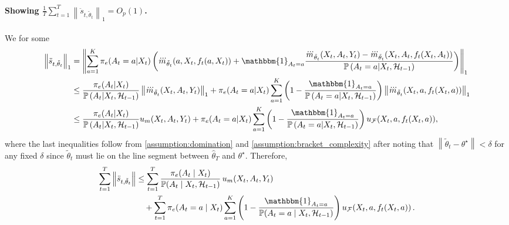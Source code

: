 \documentclass[11pt]{article}
\newcommand{\norm}[1]{\left\lVert#1\right\rVert}
\begin{document}
\begin{appendix}
\paragraph{Showing $\frac{1}{T}  \sum_{t=1}^{T} \norm{\ddot{s}_{t,\tilde{\theta}_{t}}}_{1} = O_{p}(1)$.}
We for some
\begin{align*}
\norm{\ddot{s}_{t,\tilde{\theta}_{t}}}_{1} &=  \norm{\sum_{a=1}^{K} \pi_{e}(A_{t} =a | X_{t}) \left( \dddot{m}_{\tilde{\theta}_{t}}(a,X_{t},f_{t}(a,X_{t}))   + \mathbbm{1}_{A_{t} = a} \frac{ \dddot{m}_{\tilde{\theta}_{t}}(X_{t},A_{t},Y_{t})  -  \dddot{m}_{\tilde{\theta}_{t}}(X_{t},A_{t},f_{t}(X_{t},A_{t})) }{ \mathbb{P} \left(A_{t} =a | X_{t},\mathcal{H}_{t-1} \right)  }\right)}_1 \\
&\le \frac{\pi_{e}(A_{t} | X_{t})}{\mathbb{P} \left(A_{t} | X_{t},\mathcal{H}_{t-1} \right) }
\norm{\dddot{m}_{\tilde{\theta}_{t}}(X_{t},A_{t},Y_{t})}_{1}+ \pi_{e}(A_{t} =a | X_{t})  \sum_{a=1}^{K} \left(1 - \frac{\mathbbm{1}_{A_{t} = a} }{\mathbb{P} \left(A_{t} =a | X_{t},\mathcal{H}_{t-1} \right)}\right) \norm{\dddot{m}_{\tilde{\theta}_{t}}(X_{t},a,f_{t}(X_{t},a))}_{1}\\
&\le \frac{\pi_{e}(A_{t} | X_{t})}{\mathbb{P} \left(A_{t} | X_{t},\mathcal{H}_{t-1} \right) }
u_{m}(X_{t},A_{t},Y_{t}) + \pi_{e}(A_{t} =a | X_{t})  \sum_{a=1}^{K} \left(1 - \frac{\mathbbm{1}_{A_{t} = a} }{\mathbb{P} \left(A_{t} =a | X_{t},\mathcal{H}_{t-1} \right)}\right) u_{\mathcal{F}}(X_{t},a,f_{t}(X_{t},a)),
\end{align*}
where the last inequalities follow from \cref{assumption:domination} and \cref{assumption:bracket_complexity} after noting that $\norm{\tilde{\theta}_{t} - \theta^{\star}} < \delta$ for any fixed $\delta$ since $\tilde{\theta}_{t}$ must lie on the line segment between $\hat{\theta}_{T}$ and $\theta^{\star}$. 
Therefore, 
\begin{align*}
\sum_{t=1}^{T} \norm{\ddot{s}_{t,\tilde{\theta}_{t}}}
&\le
\sum_{t=1}^{T}
\frac{\pi_{e}(A_{t} \mid X_{t})}
     {\mathbb{P}\!\left(A_{t} \mid X_{t},\mathcal{H}_{t-1}\right)}
\, u_{m}(X_{t},A_{t},Y_{t})  \\
&\quad
+ \sum_{t=1}^{T}
\pi_{e}(A_{t}=a \mid X_{t})
\sum_{a=1}^{K}
\Bigg(
    1
    - \frac{\mathbbm{1}_{A_{t}=a}}
           {\mathbb{P}\!\left(A_{t}=a \mid X_{t},\mathcal{H}_{t-1}\right)}
\Bigg)
\, u_{\mathcal{F}}\!\left(
    X_{t},a,f_{t}(X_{t},a)
\right).
\end{align*}


\end{appendix}
\end{document}
